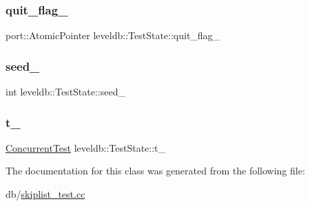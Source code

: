 \subsubsection{\texorpdfstring{quit\_flag\_}{quit\_flag\_}}
{\footnotesize\ttfamily port\+::\+Atomic\+Pointer leveldb\+::\+Test\+State\+::quit\+\_\+flag\+\_\+}

\mbox{\label{classleveldb_1_1_test_state_aa44f519b574945b0061c88df42fd4725}} 
\subsubsection{\texorpdfstring{seed\_}{seed\_}}
{\footnotesize\ttfamily int leveldb\+::\+Test\+State\+::seed\+\_\+}

\mbox{\label{classleveldb_1_1_test_state_a090fd0c59fb141c4843511b4020f05e9}} 
\subsubsection{\texorpdfstring{t\_}{t\_}}
{\footnotesize\ttfamily \mbox{\hyperlink{classleveldb_1_1_concurrent_test}{Concurrent\+Test}} leveldb\+::\+Test\+State\+::t\+\_\+}



The documentation for this class was generated from the following file\+:\begin{DoxyCompactItemize}
\item 
db/\mbox{\hyperlink{skiplist__test_8cc}{skiplist\+\_\+test.\+cc}}\end{DoxyCompactItemize}
